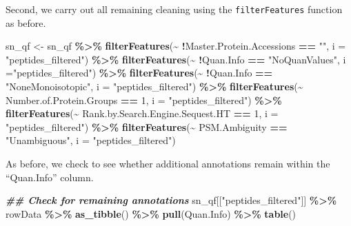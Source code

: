 \documentclass[9pt,a4paper,]{extarticle}
\newenvironment{Shaded}{\begin{snugshade}}{\end{snugshade}}
\newcommand{\AttributeTok}[1]{\textcolor[rgb]{0.13,0.29,0.53}{#1}}
\newcommand{\DecValTok}[1]{\textcolor[rgb]{0.00,0.00,0.81}{#1}}
\newcommand{\DocumentationTok}[1]{\textcolor[rgb]{0.56,0.35,0.01}{\textbf{\textit{#1}}}}
\newcommand{\FunctionTok}[1]{\textcolor[rgb]{0.13,0.29,0.53}{\textbf{#1}}}
\newcommand{\NormalTok}[1]{#1}
\newcommand{\OtherTok}[1]{\textcolor[rgb]{0.56,0.35,0.01}{#1}}
\newcommand{\SpecialCharTok}[1]{\textcolor[rgb]{0.81,0.36,0.00}{\textbf{#1}}}
\newcommand{\StringTok}[1]{\textcolor[rgb]{0.31,0.60,0.02}{#1}}
\begin{document}
Second, we carry out all remaining cleaning using the \texttt{filterFeatures} function
as before.

\begin{Shaded}
\begin{Highlighting}[]
\NormalTok{sn\_qf }\OtherTok{\textless{}{-}}\NormalTok{ sn\_qf }\SpecialCharTok{\%\textgreater{}\%}
  \FunctionTok{filterFeatures}\NormalTok{(}\SpecialCharTok{\textasciitilde{}} \SpecialCharTok{!}\NormalTok{Master.Protein.Accessions }\SpecialCharTok{==} \StringTok{""}\NormalTok{, }
                 \AttributeTok{i =} \StringTok{"peptides\_filtered"}\NormalTok{) }\SpecialCharTok{\%\textgreater{}\%}
  \FunctionTok{filterFeatures}\NormalTok{(}\SpecialCharTok{\textasciitilde{}} \SpecialCharTok{!}\NormalTok{Quan.Info }\SpecialCharTok{==} \StringTok{"NoQuanValues"}\NormalTok{, }
                 \AttributeTok{i =}\StringTok{"peptides\_filtered"}\NormalTok{) }\SpecialCharTok{\%\textgreater{}\%}
  \FunctionTok{filterFeatures}\NormalTok{(}\SpecialCharTok{\textasciitilde{}} \SpecialCharTok{!}\NormalTok{Quan.Info }\SpecialCharTok{==} \StringTok{"NoneMonoisotopic"}\NormalTok{,}
                 \AttributeTok{i =} \StringTok{"peptides\_filtered"}\NormalTok{) }\SpecialCharTok{\%\textgreater{}\%}
  \FunctionTok{filterFeatures}\NormalTok{(}\SpecialCharTok{\textasciitilde{}}\NormalTok{ Number.of.Protein.Groups }\SpecialCharTok{==} \DecValTok{1}\NormalTok{, }
                 \AttributeTok{i =} \StringTok{"peptides\_filtered"}\NormalTok{) }\SpecialCharTok{\%\textgreater{}\%}
  \FunctionTok{filterFeatures}\NormalTok{(}\SpecialCharTok{\textasciitilde{}}\NormalTok{ Rank.by.Search.Engine.Sequest.HT }\SpecialCharTok{==} \DecValTok{1}\NormalTok{, }
                 \AttributeTok{i =} \StringTok{"peptides\_filtered"}\NormalTok{) }\SpecialCharTok{\%\textgreater{}\%}
  \FunctionTok{filterFeatures}\NormalTok{(}\SpecialCharTok{\textasciitilde{}}\NormalTok{ PSM.Ambiguity }\SpecialCharTok{==} \StringTok{"Unambiguous"}\NormalTok{,}
                 \AttributeTok{i =} \StringTok{"peptides\_filtered"}\NormalTok{)}
\end{Highlighting}
\end{Shaded}

As before, we check to see whether additional annotations remain within the
``Quan.Info'' column.

\begin{Shaded}
\begin{Highlighting}[]
\DocumentationTok{\#\# Check for remaining annotations}
\NormalTok{sn\_qf[[}\StringTok{"peptides\_filtered"}\NormalTok{]] }\SpecialCharTok{\%\textgreater{}\%}
\NormalTok{  rowData }\SpecialCharTok{\%\textgreater{}\%}
  \FunctionTok{as\_tibble}\NormalTok{() }\SpecialCharTok{\%\textgreater{}\%}
  \FunctionTok{pull}\NormalTok{(Quan.Info) }\SpecialCharTok{\%\textgreater{}\%}
  \FunctionTok{table}\NormalTok{()}
\end{Highlighting}
\end{Shaded}
\end{document}
